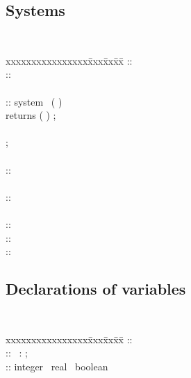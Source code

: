\subsection{Systems}
{\tt
\begin{tabbing}
xxxxxxxxxxxxxxxx\= xxx\= xx\=  xx\= \kill
\Program     \> :: \>\> \PDecl\ \PDecl *\\
\PDecl       \> :: \>\> \SystemDecl\\
\\\SystemDecl   \> :: \>\> system\ \Name \Opt{ : \ParamDecl }
                                    ( \InputDeclList )\\
\> \>\>\>  returns ( \OutputDeclList ) ;\\
\> \>\>\>  \\
\> \>\>\> \EquationBlock ;\\
\\
\Name \>::\>\> \Identifier\\
\\
\ParamDecl  \> :: \>\> \Domain \\
\\
\InputDeclList \>::\>\> \VarDeclList\\
\OutputDeclList \>::\>\> \VarDeclList\\
\LocalDeclList \>::\>\> \VarDeclList\\
\end{tabbing}
}

\subsection{Declarations of variables}
{\tt
\begin{tabbing}
xxxxxxxxxxxxxxxx\= xxx\= xx\=  xx\= \kill
\VarDeclList \>::\>\> \VarDeclList *\\
\VarDeclaration \>::\>\> \IdentifierList\ :  \ScalarType ;\\
\ScalarType \> ::\>\> integer \Alt\ real \Alt\ boolean
\end{tabbing}
}

